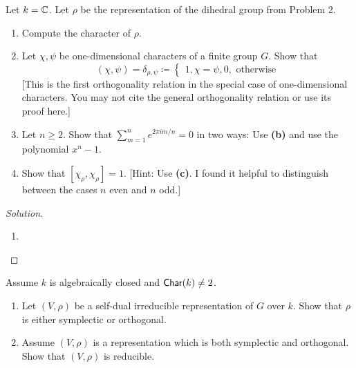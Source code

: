\begin{problem}
Let $k = \mathbb{C}$. Let $\rho$ be the representation of the dihedral group from Problem 2.

\begin{enumerate}[font=\normalfont,label=\textbf{(\alph*)}]
\item Compute the character of $\rho$.

\item Let $\chi, \psi$ be one-dimensional characters of a finite group $G$. Show that
\[
(\chi, \psi) = \delta_{\rho, \psi} \coloneqq
\begin{cases}
1, \chi = \psi,
0, \text{ otherwise}
\end{cases}
\]
[This is the first orthogonality relation in the special case of one-dimensional characters. You may not cite the general orthogonality relation or use its proof here.]
\item Let $n \geq 2$. Show that $\sum_{m=1}^n e^{2\pi im/n} = 0$ in two ways: Use \textbf{(b)} and use the polynomial $x^n-1$.
\item Show that $[\chi_\rho, \chi_\rho] = 1$. [Hint: Use \textbf{(c)}. I found it helpful to distinguish between the cases $n$ even and $n$ odd.]
\end{enumerate}
\end{problem}

\begin{proof}[Solution]
\hfill
\begin{enumerate}[font=\normalfont,label=\textbf{(\alph*)}, wide]
\item
\end{enumerate}
\end{proof}

\newpage


\begin{problem}
Assume $k$ is algebraically closed and $\mathsf{Char}(k) \neq 2$.

\begin{enumerate}[font=\normalfont,label=\textbf{(\alph*)}]
\item Let $(V, \rho)$ be a self-dual irreducible representation of $G$ over $k$. Show that $\rho$ is either symplectic or orthogonal.

\item Assume $(V, \rho)$ is a representation which is both symplectic and orthogonal. Show that $(V, \rho)$ is reducible.

\end{enumerate}
\end{problem}

